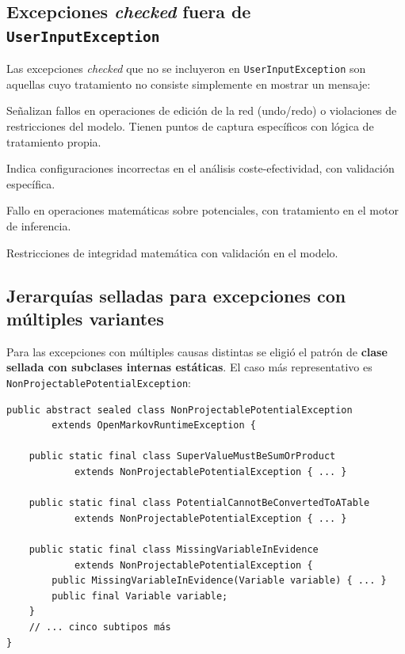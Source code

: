 \documentclass[12pt,a4paper]{article}
\begin{document}
\subsection{Excepciones \emph{checked} fuera de \texttt{UserInputException}}
\label{sec:otras-checked}

Las excepciones \emph{checked} que no se incluyeron en \texttt{UserInputException}
son aquellas cuyo tratamiento no consiste simplemente en mostrar un mensaje:

\begin{description}[leftmargin=2em]
  \item[\texttt{DoEditException} / \texttt{ConstraintViolatedException}]
    Señalizan fallos en operaciones de edición de la red (undo/redo) o violaciones
    de restricciones del modelo. Tienen puntos de captura específicos con lógica
    de tratamiento propia.
  \item[\texttt{CostEffectivenessException}] Indica configuraciones incorrectas
    en el análisis coste-efectividad, con validación específica.
  \item[\texttt{PotentialOperationException}] Fallo en operaciones matemáticas
    sobre potenciales, con tratamiento en el motor de inferencia.
  \item[Excepciones de intervalo] Restricciones de integridad matemática con
    validación en el modelo.
\end{description}

\subsection{Jerarquías selladas para excepciones con múltiples variantes}
\label{sec:sealed-design}

Para las excepciones con múltiples causas distintas se eligió el patrón de
\textbf{clase sellada con subclases internas estáticas}. El caso más
representativo es \texttt{NonProjectablePotentialException}:

\begin{lstlisting}[caption={Jerarquía sellada de
  \texttt{NonProjectablePotentialException} (extracto)}]
public abstract sealed class NonProjectablePotentialException
        extends OpenMarkovRuntimeException {

    public static final class SuperValueMustBeSumOrProduct
            extends NonProjectablePotentialException { ... }

    public static final class PotentialCannotBeConvertedToATable
            extends NonProjectablePotentialException { ... }

    public static final class MissingVariableInEvidence
            extends NonProjectablePotentialException {
        public MissingVariableInEvidence(Variable variable) { ... }
        public final Variable variable;
    }
    // ... cinco subtipos más
}
\end{lstlisting}
\end{document}
